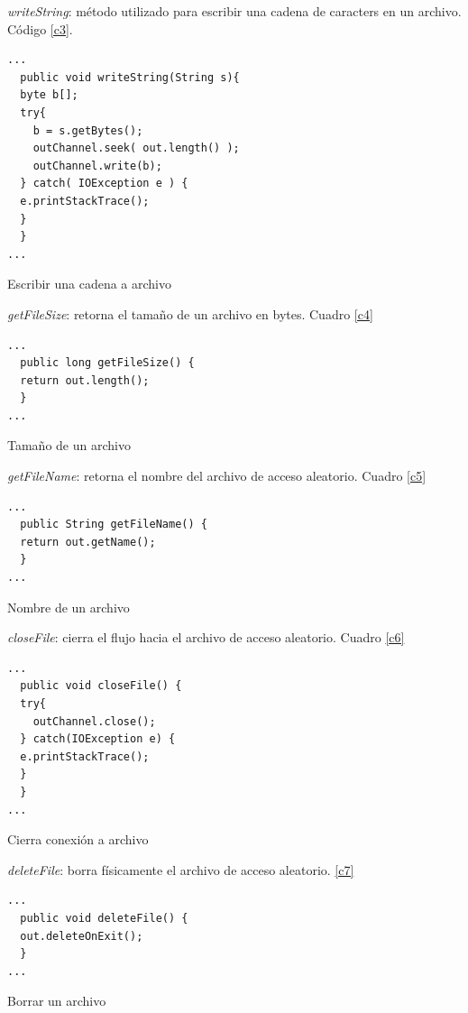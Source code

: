 \textit{writeString}: m\'etodo utilizado para escribir una cadena de caracters en un archivo. C\'odigo \ref{c3}.

\begin{codigof}[!h]
\begin{verbatim}
...
  public void writeString(String s){
  byte b[];
  try{
    b = s.getBytes();
    outChannel.seek( out.length() );
    outChannel.write(b);
  } catch( IOException e ) {
  e.printStackTrace();
  }
  }
...
\end{verbatim}
\caption{Escribir una cadena a archivo}
\label{c3}
\end{codigof}

\textit{getFileSize}: retorna el tama\~no de un archivo en bytes. Cuadro \ref{c4}\\

\begin{codigof}[!h]
\begin{verbatim}
...
  public long getFileSize() {
  return out.length();
  }
...
\end{verbatim}
\caption{Tama\~no de un archivo}
\label{c4}
\end{codigof}

 \textit{getFileName}: retorna el nombre del archivo de acceso aleatorio. Cuadro \ref{c5}\\

\begin{codigof}[t]
\begin{verbatim}
...
  public String getFileName() {
  return out.getName();
  }
...
\end{verbatim}
\caption{Nombre de un archivo}
\label{c5}
\end{codigof}

 \textit{closeFile}: cierra el flujo hacia el archivo de acceso aleatorio. Cuadro \ref{c6} \\

\begin{codigof}[h]
\begin{verbatim}
...
  public void closeFile() {
  try{
    outChannel.close();
  } catch(IOException e) {
  e.printStackTrace();
  }
  }
...
\end{verbatim}
\caption{Cierra conexi\'on a archivo}
\label{c6}
\end{codigof}
 \textit{deleteFile}: borra f\'i{}sicamente el archivo de acceso aleatorio. \ref{c7} \\

\begin{codigof}[h]
\begin{verbatim}
...
  public void deleteFile() {
  out.deleteOnExit();
  }
...
\end{verbatim}
\caption{Borrar un archivo}
\label{c7}
\end{codigof}

